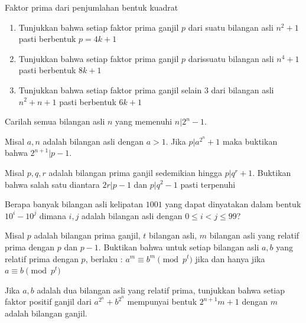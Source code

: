 \documentclass[11pt]{scrartcl}
\begin{document}
\begin{problem}
    Faktor prima dari penjumlahan bentuk kuadrat
    \begin{enumerate}
        \item Tunjukkan bahwa setiap faktor prima ganjil $p$ dari suatu bilangan asli $n^2 + 1$ pasti berbentuk $p = 4k + 1$
        \item Tunjukkan bahwa setiap faktor prima ganjil $p$ darissuatu bilangan asli $n^4 + 1$ pasti berbentuk $8k + 1$
        \item Tunjukkan bahwa setiap faktor prima ganjil selain $3$ dari bilangan asli $n^2 + n + 1$ pasti berbentuk $6k + 1$ 
    \end{enumerate}
\end{problem}

\begin{problem}
    Carilah semua bilangan asli $n$ yang memenuhi $n | 2^n - 1$.
\end{problem}

\begin{problem}
    Misal $a,n$ adalah bilangan asli dengan $a > 1$. Jika $ p | a^{2^n} + 1$ maka buktikan bahwa $2^{n + 1} | p - 1$.
\end{problem}

\begin{problem}
    Misal $p,q,r$ adalah bilangan prima ganjil sedemikian hingga $p | q^r + 1$. Buktikan bahwa salah satu diantara $2r | p - 1$ dan $p | q^2 - 1$ pasti terpenuhi
\end{problem}

\begin{problem}
    Berapa banyak bilangan asli kelipatan $1001$ yang dapat dinyatakan dalam bentuk $10^i - 10^j$ dimana $i,j$ adalah bilangan asli dengan $0 \leq i < j \leq  99$?
\end{problem}

\begin{problem}
    Misal $p$ adalah bilangan prima ganjil, $t$ bilangan asli, $m$ bilangan asli yang relatif prima dengan $p$ dan $p - 1$. Buktikan bahwa untuk setiap bilangan asli $a,b$ yang relatif prima dengan $p$, berlaku : $a^m \equiv b^m \pmod{p^t}$ jika dan hanya jika $a \equiv b \pmod{p^t}$
\end{problem}

\begin{problem}
    Jika $a,b$ adalah dua bilangan asli yang relatif prima, tunjukkan bahwa setiap faktor positif ganjil dari $a^{2^n} + b^{2^n}$ mempunyai bentuk $2^{n + 1}m + 1$ dengan $m$ adalah bilangan ganjil.
\end{problem}
\end{document}
